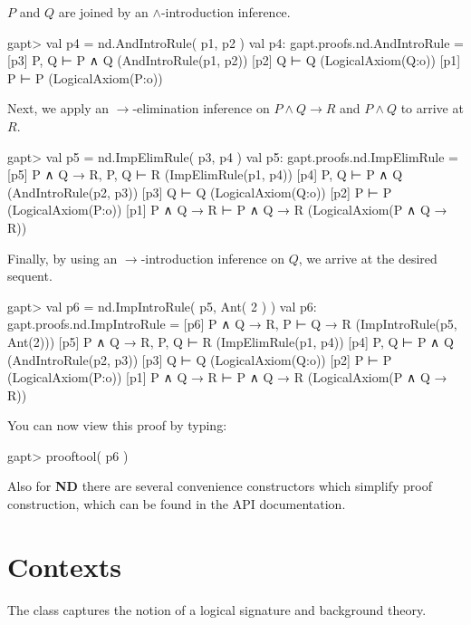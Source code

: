 \documentclass[a4paper,11pt]{book}
\newcommand{\impl}{\to} %
\renewcommand{\land}{\wedge}
\newcommand{\ND}{\textbf{ND}}
\newcommand{\cli}[1]{{\ttfamily {#1}}}
\begin{document}
$P$ and $Q$ are joined by an $\land$-introduction inference.

\begin{clilisting}
  gapt> val p4 = nd.AndIntroRule( p1, p2 )
  val p4: gapt.proofs.nd.AndIntroRule = [p3] P, Q ⊢ P ∧ Q    (AndIntroRule(p1, p2))
  [p2] Q ⊢ Q    (LogicalAxiom(Q:o))
  [p1] P ⊢ P    (LogicalAxiom(P:o))

\end{clilisting}

Next, we apply an $\impl$-elimination inference on $P \land Q \impl R$
and $P \land Q$ to arrive at $R$.

\begin{clilisting}
  gapt> val p5 = nd.ImpElimRule( p3, p4 )
  val p5: gapt.proofs.nd.ImpElimRule = [p5] P ∧ Q → R, P, Q ⊢ R    (ImpElimRule(p1, p4))
  [p4] P, Q ⊢ P ∧ Q    (AndIntroRule(p2, p3))
  [p3] Q ⊢ Q    (LogicalAxiom(Q:o))
  [p2] P ⊢ P    (LogicalAxiom(P:o))
  [p1] P ∧ Q → R ⊢ P ∧ Q → R    (LogicalAxiom(P ∧ Q → R))

\end{clilisting}

Finally, by using an $\impl$-introduction inference on $Q$, we arrive
at the desired sequent.

\begin{clilisting}
  gapt> val p6 = nd.ImpIntroRule( p5, Ant( 2 ) )
  val p6: gapt.proofs.nd.ImpIntroRule = [p6] P ∧ Q → R, P ⊢ Q → R    (ImpIntroRule(p5, Ant(2)))
  [p5] P ∧ Q → R, P, Q ⊢ R    (ImpElimRule(p1, p4))
  [p4] P, Q ⊢ P ∧ Q    (AndIntroRule(p2, p3))
  [p3] Q ⊢ Q    (LogicalAxiom(Q:o))
  [p2] P ⊢ P    (LogicalAxiom(P:o))
  [p1] P ∧ Q → R ⊢ P ∧ Q → R    (LogicalAxiom(P ∧ Q → R))

\end{clilisting}

You can now view this proof by typing:
\begin{clilisting}
  gapt> prooftool( p6 )

\end{clilisting}

Also for {\ND} there are several convenience constructors which simplify proof
construction, which can be found in the API documentation.

\section{Contexts}\label{sec:context}
The \cli{Context} class captures the notion of a logical signature and background
theory.
\end{document}
